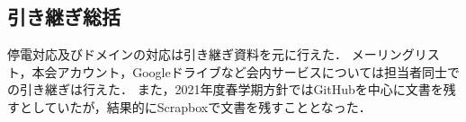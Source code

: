 \subsection*{引き継ぎ総括}


停電対応及びドメインの対応は引き継ぎ資料を元に行えた．
メーリングリスト，本会アカウント，Googleドライブなど会内サービスについては担当者同士での引き継ぎは行えた．
また，2021年度春学期方針ではGitHubを中心に文書を残すとしていたが，結果的にScrapboxで文書を残すこととなった．